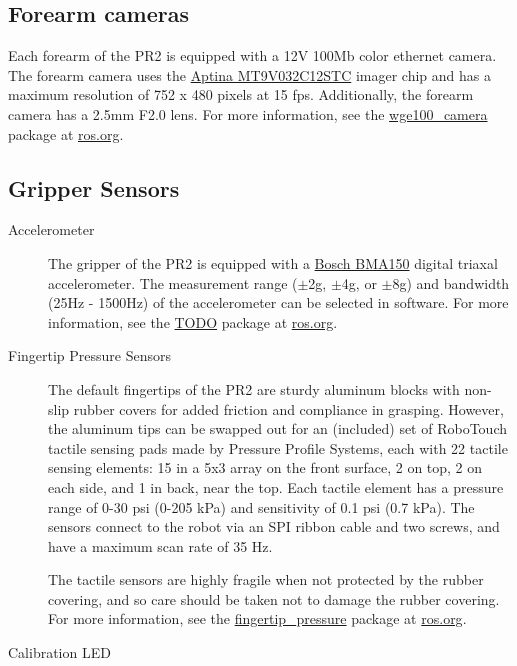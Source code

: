 \subsection{Forearm cameras}
Each forearm of the PR2 is equipped with a 12V 100Mb color ethernet camera. The forearm camera uses the 
\href{http://www.aptina.com/products/image_sensors/mt9v032c12stc/#overview}{Aptina MT9V032C12STC}  imager chip
and has a maximum resolution of 752 x 480 pixels at 15 fps. Additionally, the forearm camera has a 2.5mm F2.0 lens.  
For more information, see the \href{http://www.ros.org/wiki/wge100_camera}{wge100\_camera} package
at \href{http://www.ros.org}{ros.org}.

\subsection{Gripper Sensors}
\begin{description}

\item[Accelerometer]
The gripper of the PR2 is equipped with a \href{http://www.bosch-sensortec.com/content/language1/html/3474.htm}{Bosch BMA150} 
digital triaxal accelerometer. The measurement range ($\pm$2g, $\pm$4g, or $\pm$8g) and bandwidth (25Hz - 1500Hz) 
of the accelerometer can be selected in software. For more information, see the \href{http://www.ros.org/wiki/wge100_camera}{TODO} 
package at \href{http://www.ros.org}{ros.org}.

\item[Fingertip Pressure Sensors]
The default fingertips of the PR2 are sturdy aluminum blocks with non-slip 
rubber covers for added friction and compliance in grasping.  However, the 
aluminum tips can be swapped out for an (included) set of RoboTouch tactile 
sensing pads made by Pressure Profile Systems, each with 22 tactile sensing 
elements: 15 in a 5x3 array on the front surface, 2 on top, 2 on each side, 
and 1 in back, near the top.  Each tactile element has a pressure range of 
0-30 psi (0-205 kPa) and sensitivity of 0.1 psi (0.7 kPa).  The sensors 
connect to the robot via an SPI ribbon cable and two screws, and have a 
maximum scan rate of 35 Hz.

The tactile sensors are highly fragile when not protected by the rubber 
covering, and so care should be taken not to damage the rubber covering.  For more information, 
see the \href{http://www.ros.org/wiki/fingertip\_pressure}{fingertip\_pressure} package at \href{http://ros.org}{ros.org}.

\item[Calibration LED]

\end{description}

